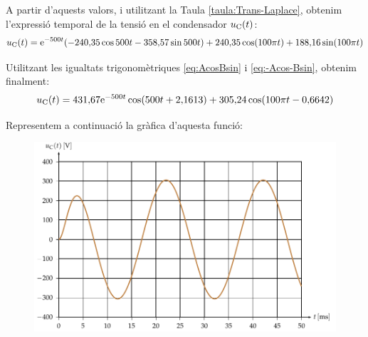 \begin{exemple}
A partir d'aquests valors, i utilitzant la Taula
\vref{taula:Trans-Laplace}, obtenim l'expressi\'{o} temporal de la
tensi\'{o} en el condensador $u_\mathrm{C}(t)$:
\[
    u_\mathrm{C}(t) = \mathrm{e}^{-500t} (-240{,}35 \cos 500 t - 358{,}57 \sin 500
    t) + 240{,}35 \cos (100\pi t) + 188{,}16 \sin( 100\pi
    t)
\]

Utilitzant les igualtats trigonom\`{e}triques \eqref{eq:AcosBsin} i
\eqref{eq:-Acos-Bsin}, obtenim finalment:
\[
    u_\mathrm{C}(t)= 431{,}67 \mathrm{e}^{-500t} \cos(500 t +2{,}1613) + 305{,}24 \cos (100\pi t - 0{,}6642)
\]


 Representem a continuaci\'{o} la gr\`{a}fica d'aquesta
funci\'{o}:

\begin{figure}[h]
\centering
  \includegraphics{Imatges/Cap-Laplace-Exemple4-Tensio.pdf}
\end{figure}

\end{exemple}
